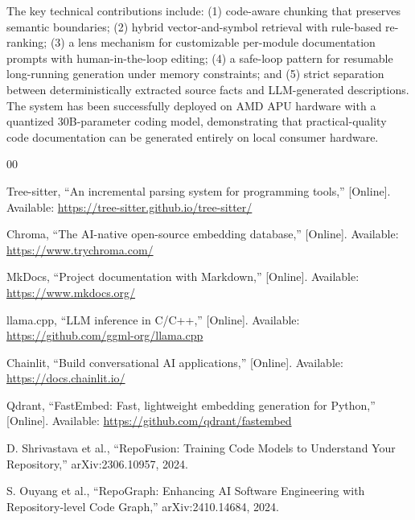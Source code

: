 \documentclass[10pt,twocolumn]{article}
\begin{document}
The key technical contributions include: (1) code-aware chunking that preserves semantic boundaries; (2) hybrid vector-and-symbol retrieval with rule-based re-ranking; (3) a lens mechanism for customizable per-module documentation prompts with human-in-the-loop editing; (4) a safe-loop pattern for resumable long-running generation under memory constraints; and (5) strict separation between deterministically extracted source facts and LLM-generated descriptions. The system has been successfully deployed on AMD APU hardware with a quantized 30B-parameter coding model, demonstrating that practical-quality code documentation can be generated entirely on local consumer hardware.

\begin{thebibliography}{00}

Tree-sitter, ``An incremental parsing system for programming tools,'' [Online]. Available: \url{https://tree-sitter.github.io/tree-sitter/}

Chroma, ``The AI-native open-source embedding database,'' [Online]. Available: \url{https://www.trychroma.com/}

MkDocs, ``Project documentation with Markdown,'' [Online]. Available: \url{https://www.mkdocs.org/}

llama.cpp, ``LLM inference in C/C++,'' [Online]. Available: \url{https://github.com/ggml-org/llama.cpp}

Chainlit, ``Build conversational AI applications,'' [Online]. Available: \url{https://docs.chainlit.io/}

Qdrant, ``FastEmbed: Fast, lightweight embedding generation for Python,'' [Online]. Available: \url{https://github.com/qdrant/fastembed}

D. Shrivastava et al., ``RepoFusion: Training Code Models to Understand Your Repository,'' arXiv:2306.10957, 2024.

S. Ouyang et al., ``RepoGraph: Enhancing AI Software Engineering with Repository-level Code Graph,'' arXiv:2410.14684, 2024.

\end{thebibliography}
\end{document}
